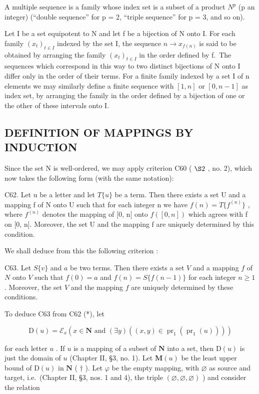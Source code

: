 A multiple sequence is a family whose index set is a subset of a product \(N^{p}\) (p an integer) (``double sequence'' for p = 2, ``triple sequence'' for p = 3, and so on).

Let I be a set equipotent to N and let f be a bijection of N onto I. For each family \((x_{t})_{t\in I}\) indexed by the set I, the sequence \(n\to x_{f(n)}\) is said to be obtained by arranging the family \((x_{t})_{t\in I}\) in the order defined by f.~The sequences which correspond in this way to two distinct bijections of N onto I differ only in the order of their terms. For a finite family indexed by a set I of n elements we may similarly define a finite sequence with \([1,n]\) or \([0,n-1]\) as index set, by arranging the family in the order defined by a bijection of one or the other of these intervals onto I.

\subsection{DEFINITION OF MAPPINGS BY INDUCTION}

Since the set N is well-ordered, we may apply criterion C60 ( \(\S2\) , no. 2), which now takes the following form (with the same notation):

C62. Let u be a letter and let \(T\{u\}\) be a term. Then there exists a set U and a mapping f of N onto U such that for each integer n we have \(f(n)=T\{f^{(n)}\}\) , where \(f^{(n)}\) denotes the mapping of {[}0, n{[} onto \(f([0, n])\) which agrees with f on {[}0, n{]}. Moreover, the set U and the mapping f are uniquely determined by this condition.

We shall deduce from this the following criterion :

C63. Let \(S\{v\}\) and \(a\) be two terms. Then there exists a set \(V\) and a mapping \(f\) of \(N\) onto \(V\) such that \(f(0) = a\) and \(f(n) = S\{f(n-1)\}\) for each integer \(n \geqslant 1\) . Moreover, the set \(V\) and the mapping \(f\) are uniquely determined by these conditions.

To deduce C63 from C62 (*), let

\[
\mathrm{D} (u) = \mathcal {E} _ {x} (x \in \mathbf {N} \text {   and   } (\exists y) ((x, y) \in \operatorname{pr} _ {1} (\operatorname{pr} _ {1} (u))))
\]

for each letter \(u\) . If \(u\) is a mapping of a subset of \(\mathbf{N}\) into a set, then \(\mathrm{D}(u)\) is just the domain of \(u\) (Chapter II, §3, no. 1). Let \(\mathbf{M}(u)\) be the least upper bound of \(\mathrm{D}(u)\) in \(\mathbf{N}\) ( \(\dagger\) ). Let \(\varphi\) be the empty mapping, with \(\varnothing\) as source and target, i.e.~(Chapter II, §3, nos. 1 and 4), the triple \((\varnothing, \varnothing, \varnothing)\) ) and consider the relation

